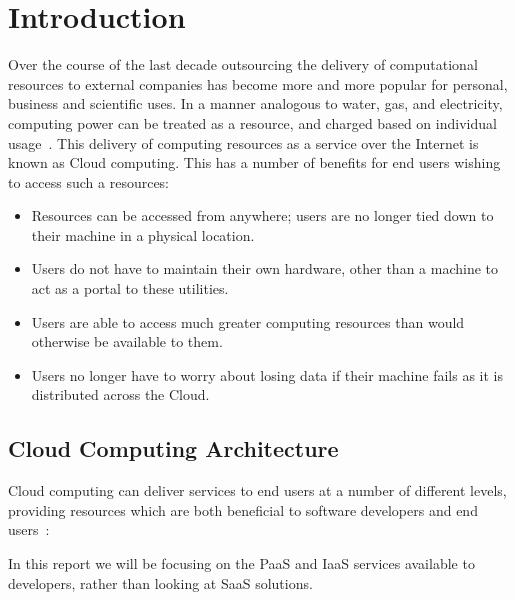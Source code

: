 \chapter{Introduction}
Over the course of the last decade outsourcing the delivery of computational resources to external companies has become more and more popular for personal, business and scientific uses. In a manner analogous to water, gas, and electricity, computing power can be treated as a resource, and charged based on individual usage~\cite{Aneka}. This delivery of computing resources as a service over the Internet is known as Cloud computing. This has a number of benefits for end users wishing to access such a resources:
\begin{itemize}
\item Resources can be accessed from anywhere; users are no longer tied down to their machine in a physical location.
\item Users do not have to maintain their own hardware, other than a machine to act as a portal to these utilities.
\item Users are able to access much greater computing resources than would otherwise be available to them.
\item Users no longer have to worry about losing data if their machine fails as it is distributed across the Cloud.
\end{itemize}

\section{Cloud Computing Architecture}
Cloud computing can deliver services to end users at a number of different levels, providing resources which are both beneficial to software developers and end users~\cite{Aneka}:
\begin{itemize}
\end{itemize}

In this report we will be focusing on the PaaS and IaaS services available to developers, rather than looking at SaaS solutions. 
